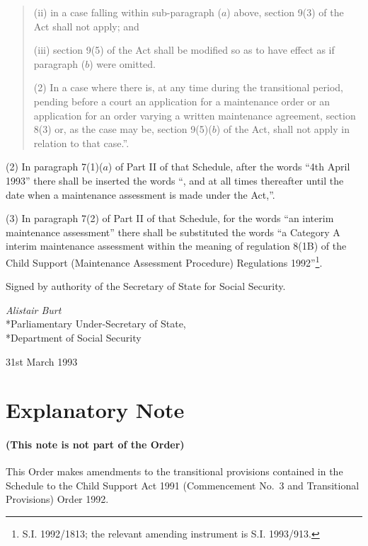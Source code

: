 \documentclass[a4paper]{article}
\newcommand{\parthead}{}
\begin{document}
\begin{quotation}
\begin{enumerate}
(ii) in a case falling within sub-paragraph ($a$) above, section 9(3) of the Act shall not apply; and

(iii) section 9(5) of the Act shall be modified so as to have effect as if paragraph ($b$) were omitted.
\end{enumerate}

(2) In a case where there is, at any time during the transitional period, pending before a court an application for a maintenance order or an application for an order varying a written maintenance agreement, section 8(3) or, as the case may be, section 9(5)($b$) of the Act, shall not apply in relation to that case.”.
\end{quotation}

(2) In paragraph 7(1)($a$) of Part II of that Schedule, after the words “4th April 1993” there shall be inserted the words “, and at all times thereafter until the date when a maintenance assessment is made under the Act,”.

(3) In paragraph 7(2) of Part II of that Schedule, for the words “an interim maintenance assessment” there shall be substituted the words “a Category A interim maintenance assessment within the meaning of regulation 8(1B) of the Child Support (Maintenance Assessment Procedure) Regulations 1992”\footnote{\frenchspacing S.I. 1992/1813; the relevant amending instrument is S.I. 1993/913.}.

\bigskip

Signed by authority of the Secretary of State for Social Security.

{\raggedleft
\emph{Alistair Burt}\\*Parliamentary Under-Secretary of State,\\*Department of Social Security

}

31st March 1993

\part{Explanatory Note}

\renewcommand\parthead{--- Explanatory Note}

\subsection*{(This note is not part of the Order)}

This Order makes amendments to the transitional provisions contained in the Schedule to the Child Support Act 1991 (Commencement No.\ 3 and Transitional Provisions) Order 1992.
\end{document}
